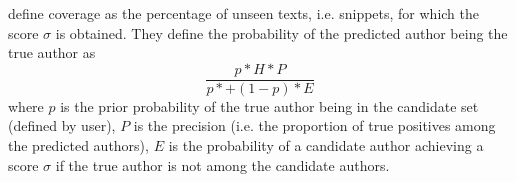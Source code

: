 \citet{koppel_authorship_2011} define coverage as the percentage of unseen texts, i.e. snippets, 
for which the score $\sigma$ is obtained.
They define the probability of the predicted author being the true author as 
$$\frac{p * H * P}{p * + (1-p) * E}$$
where $p$ is the prior probability of the true author being in the candidate set (defined by user),
$P$ is the precision (i.e. the proportion of true positives among the predicted authors),
$E$ is the probability of a candidate author achieving a score $\sigma$ if the true author is not among the candidate authors.
